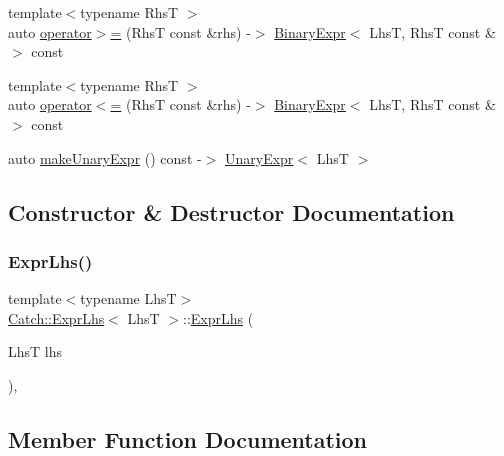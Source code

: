 \begin{DoxyCompactItemize}
\item 
{\footnotesize template$<$typename RhsT $>$ }\\auto \mbox{\hyperlink{class_catch_1_1_expr_lhs_aff594ae5b957105c517a6257d2e730f0}{operator$>$=}} (RhsT const \&rhs) -\/$>$ \mbox{\hyperlink{class_catch_1_1_binary_expr}{Binary\+Expr}}$<$ LhsT, RhsT const \&$>$ const
\item 
{\footnotesize template$<$typename RhsT $>$ }\\auto \mbox{\hyperlink{class_catch_1_1_expr_lhs_a6bd8a22c1a7fe2f66d71d7196f20af4f}{operator$<$=}} (RhsT const \&rhs) -\/$>$ \mbox{\hyperlink{class_catch_1_1_binary_expr}{Binary\+Expr}}$<$ LhsT, RhsT const \&$>$ const
\item 
auto \mbox{\hyperlink{class_catch_1_1_expr_lhs_ab68bd6d5d3ae21b7fba9010150fba95d}{make\+Unary\+Expr}} () const -\/$>$ \mbox{\hyperlink{class_catch_1_1_unary_expr}{Unary\+Expr}}$<$ LhsT $>$
\end{DoxyCompactItemize}


\subsection{Constructor \& Destructor Documentation}
\mbox{\label{class_catch_1_1_expr_lhs_ad22c6af1a7d6993240624d299714a479}} 
\subsubsection{\texorpdfstring{Expr\+Lhs()}{ExprLhs()}}
{\footnotesize\ttfamily template$<$typename LhsT$>$ \\
\mbox{\hyperlink{class_catch_1_1_expr_lhs}{Catch\+::\+Expr\+Lhs}}$<$ LhsT $>$\+::\mbox{\hyperlink{class_catch_1_1_expr_lhs}{Expr\+Lhs}} (\begin{DoxyParamCaption}\item[{LhsT}]{lhs }\end{DoxyParamCaption})\hspace{0.3cm}{\ttfamily [inline]}, {\ttfamily [explicit]}}



\subsection{Member Function Documentation}
\mbox{\label{class_catch_1_1_expr_lhs_ab68bd6d5d3ae21b7fba9010150fba95d}} 
